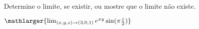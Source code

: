 Determine o limite, se existir, ou mostre que o limite não existe.

$\mathlarger{\lim_{(x,y,z)\rightarrow(3,0,1)} e^{xy}\sin (\pi \frac z 2)}$

